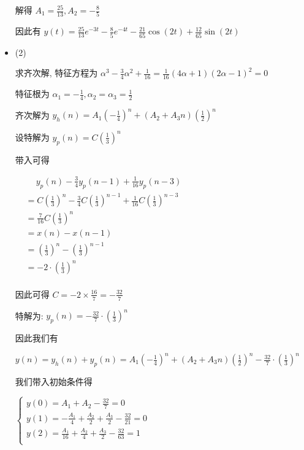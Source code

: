 \documentclass[a4paper,UTF8]{article}
\numberwithin{equation}{section}
\begin{document}
\begin{framed}
\begin{spacing}{1.5}
\begin{itemize}
      解得 $\displaystyle A_{1} = \frac{25}{13}, A_{2} = - \frac{8}{5}$
      
      因此有 $\displaystyle y(t) = \frac{25}{13}e^{-3t} - \frac{8}{5}e^{-4t} - \frac{21}{65}\cos(2t) + \frac{12}{65}\sin(2t)$
      
      \item (2)
      
      求齐次解, 特征方程为 $\displaystyle \alpha^{3}-\frac{3}{4}\alpha^{2}+\frac{1}{16} = \frac{1}{16}(4 \alpha + 1)(2 \alpha - 1)^{2} = 0$
      
      特征根为 $\displaystyle \alpha_1 = -\frac{1}{4}, \alpha_2 = \alpha_3 = \frac{1}{2}$
      
      齐次解为 $\displaystyle y_h(n) = A_1 (-\frac{1}{4})^{n} + (A_2 + A_3n)(\frac{1}{2})^{n}$
      
      设特解为 $\displaystyle y_p(n) = C(\frac{1}{3})^{n}$
      
      带入可得
      
      $
      \begin{aligned}
      &\quad\ y_p(n) - \frac{3}{4}y_p(n-1) + \frac{1}{16}y_p(n-3) \\
      &= C(\frac{1}{3})^{n} - \frac{3}{4}C(\frac{1}{3})^{n-1} + \frac{1}{16}C(\frac{1}{3})^{n-3} \\
      &= \frac{7}{16}C(\frac{1}{3})^{n} \\
      &= x(n) - x(n-1) \\
      &= (\frac{1}{3})^{n} - (\frac{1}{3})^{n-1} \\
      &= - 2 \cdot (\frac{1}{3})^{n} \\
      \end{aligned}
      $
      
      因此可得 $\displaystyle C = -2 \times \frac{16}{7} = - \frac{32}{7}$
      
      特解为: $\displaystyle y_p(n) = - \frac{32}{7}\cdot (\frac{1}{3})^{n}$
      
      因此我们有
      
      $\displaystyle y(n) = y_h(n) + y_p(n) = A_1 (-\frac{1}{4})^{n} + (A_2 + A_3n)(\frac{1}{2})^{n} - \frac{32}{7}\cdot (\frac{1}{3})^{n}$
      
      我们带入初始条件得
      
      $
      \begin{cases}
          \displaystyle y(0) = A_{1} + A_{2} - \frac{32}{7} = 0 \\
          \displaystyle y(1) = - \frac{A_{1}}{4} + \frac{A_{2}}{2} + \frac{A_{3}}{2} - \frac{32}{21} = 0 \\
          \displaystyle y(2) = \frac{A_{1}}{16} + \frac{A_{2}}{4} + \frac{A_{3}}{2} - \frac{32}{63} = 1 \\
      \end{cases}
      $
      

\end{itemize}
\end{spacing}
\end{framed}
\end{document}
